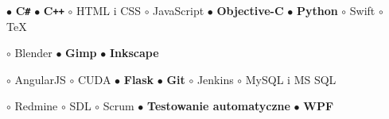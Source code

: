 \documentclass[11pt,a4paper]{article}
\begin{document}
    \smallskip
    $\bullet$ {\bf C\texttt{\#}}
    \hspace{0.34cm}
    $\bullet$ {\bf C\texttt{++}}
    \hspace{0.34cm}
    $\circ$ HTML i CSS
    \hspace{0.34cm}
    $\circ$ JavaScript
    \hspace{0.34cm}
    $\bullet$ {\bf Objective-C}
    \hspace{0.34cm}
    $\bullet$ {\bf Python}
    \hspace{0.34cm}
    $\circ$ Swift
    \hspace{0.34cm}
    $\circ$ TeX


    \smallskip


    \smallskip
    $\circ$ Blender
    \hspace{0.34cm}
    $\bullet$ {\bf Gimp}
    \hspace{0.34cm}
    $\bullet$ {\bf Inkscape}


    \smallskip


    \smallskip
    $\circ$ AngularJS
    \hspace{0.34cm}
    $\circ$ CUDA
    \hspace{0.34cm}
    $\bullet$ {\bf Flask}
    \hspace{0.34cm}
    $\bullet$ {\bf Git}
    \hspace{0.34cm}
    $\circ$ Jenkins
    \hspace{0.34cm}
    $\circ$ MySQL i MS SQL

    \vspace{0.04cm}
    $\circ$ Redmine
    \hspace{0.34cm}
    $\circ$ SDL
    \hspace{0.34cm}
    $\circ$ Scrum
    \hspace{0.34cm}
    $\bullet$ {\bf Testowanie automatyczne}
    \hspace{0.34cm}
    $\bullet$ {\bf WPF}
  

    \bigskip
  
\end{document}
